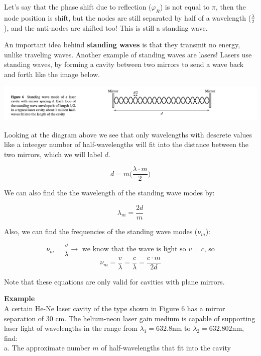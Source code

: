 \documentclass[10pt]{article}
\begin{document}
Let's say that the phase shift due to reflection ($\varphi_R$) is not equal to $\pi$, then the node position is shift, but the nodes are still separated by half of a wavelength ($\frac{\lambda}{2}$), and the anti-nodes are shifted too! This is still a standing wave.

\newblock

An important idea behind \textbf{standing waves} is that they transmit no energy, unlike traveling waves. Another example of standing waves are lasers! Lasers use standing waves, by forming a cavity between two mirrors to send a wave back and forth like the image below.

\begin{center}
    \includegraphics*[scale = .75]{imgs/standing-wave-for-lazer.png}
\end{center}

Looking at the diagram above we see that only wavelengths with descrete values like a inteeger number of half-wavelengths will fit into the distance between the two mirrors, which we will label $d$.

\[d = m \bigg( \frac{\lambda\cdot m}{2} \bigg)\]

\newpage

We can also find the the wavelength of the standing wave modes by: 

\[\lambda_m = \frac{2d}{m}\]

Also, we can find the frequencies of the standing wave modes ($\nu_m$):

\[\nu_m = \frac{v}{\lambda} \to \text{ we know that the wave is light so $v = c$, so}\]
\[ \nu_m = \frac{v}{\lambda} = \frac{c}{\lambda} = \frac{c\cdot m}{2d}\]

Note that these equations are only valid for cavities with plane mirrors.

\textbf{Example} 
\\ \newblock
A certain He-Ne laser cavity of the type shown in Figure 6 has a mirror
separation of 30 cm. The helium-neon laser gain medium is capable of
supporting laser light of wavelengths in the range from $\lambda_1 = 632.8$nm to $\lambda_2 = 632.802$nm, find:
\\ \newblock
a. The approximate number $m$ of half-wavelengths that fit into the cavity
\end{document}
